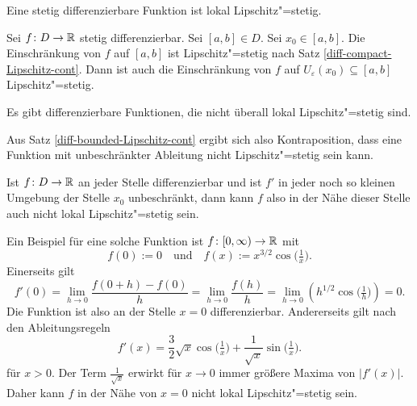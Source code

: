 \begin{Korollar}
Eine stetig differenzierbare Funktion ist lokal Lipschitz"=stetig.
\end{Korollar}
\begin{Beweis}
Sei $f\colon D\to\mathbb R$ stetig differenzierbar. Sei $[a,b]\in D$. Sei
$x_0\in [a,b]$. Die Einschränkung von $f$ auf $[a,b]$ ist
Lipschitz"=stetig nach Satz \ref{diff-compact-Lipschitz-cont}.
Dann ist auch die Einschränkung von $f$ auf
$U_\varepsilon(x_0)\subseteq [a,b]$ Lipschitz"=stetig.\;\qedsymbol
\end{Beweis}

\begin{Satz}
Es gibt differenzierbare Funktionen, die nicht überall lokal
Lipschitz"=stetig sind.
\end{Satz}
\begin{Beweis}
Aus Satz \ref{diff-bounded-Lipschitz-cont} ergibt sich also
Kontraposition, dass eine Funktion mit unbeschränkter Ableitung
nicht Lipschitz"=stetig sein kann.

Ist $f\colon D\to\mathbb R$ an jeder Stelle differenzierbar und ist $f'$
in jeder noch so kleinen Umgebung der Stelle $x_0$ unbeschränkt, dann
kann $f$ also in der Nähe dieser Stelle auch nicht lokal
Lipschitz"=stetig sein.

Ein Beispiel für eine solche Funktion ist $f\colon{}[0,\infty)\to\mathbb R$
mit
\[f(0):=0\quad \text{und}\quad f(x):=x^{3/2}\cos\Big(\tfrac{1}{x}\Big).\]
Einerseits gilt
\[f'(0) = \lim_{h\to 0}\frac{f(0+h)-f(0)}{h} = \lim_{h\to 0}\frac{f(h)}{h}
= \lim_{h\to 0} (h^{1/2}\cos\Big(\tfrac{1}{h}\Big)) = 0.\]
Die Funktion ist also an der Stelle $x=0$ differenzierbar.
Andererseits gilt nach den Ableitungsregeln%
\[f'(x) = \frac{3}{2}\sqrt{x}\cos\Big(\tfrac{1}{x}\Big)+\frac{1}{\sqrt{x}}\sin\Big(\tfrac{1}{x}\Big).\]
für $x>0$. Der Term $\tfrac{1}{\sqrt{x}}$ erwirkt für $x\to 0$ immer
größere Maxima von $|f'(x)|$. Daher kann $f$ in der Nähe von $x=0$ nicht
lokal Lipschitz"=stetig sein.\;\qedsymbol
\end{Beweis}

